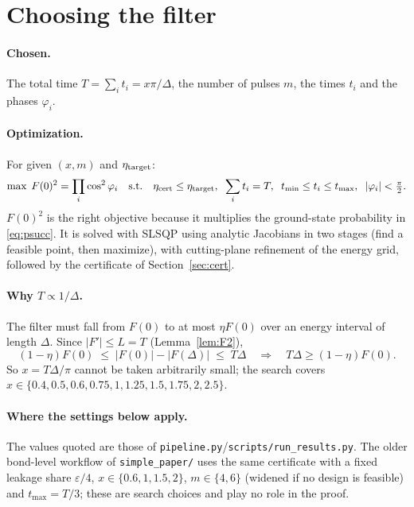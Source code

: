\documentclass[11pt]{article}
\theoremstyle{definition}
\newcommand{\abs}[1]{\left\lvert #1\right\rvert}
\newcommand{\eps}{\varepsilon}
\newcommand{\code}[1]{\texttt{#1}}
\begin{document}
\section{Choosing the filter}\label{sec:design}
\paragraph{Chosen.} The total time $T=\sum_it_i=x\pi/\Delta$, the number of pulses $m$, the times $t_i$ and the phases
$\varphi_i$.

\paragraph{Optimization.} For given $(x,m)$ and $\eta_{\rm target}$:
\begin{equation}
  \max\;F(0)^2=\prod_i\cos^2\varphi_i\quad\text{s.t.}\quad\eta_{\rm cert}\le\eta_{\rm target},\;\;\sum_it_i=T,\;\;t_{\min}\le t_i\le t_{\max},\;\;\abs{\varphi_i}<\tfrac\pi2 .
\end{equation}
$F(0)^2$ is the right objective because it multiplies the ground-state probability in \eqref{eq:psucc}. It is solved with
SLSQP using analytic Jacobians in two stages (find a feasible point, then maximize), with cutting-plane refinement of the
energy grid, followed by the certificate of Section~\ref{sec:cert}.

\paragraph{Why $T\propto1/\Delta$.} The filter must fall from $F(0)$ to at most $\eta F(0)$ over an energy interval of
length $\Delta$. Since $\abs{F'}\le L=T$ (Lemma~\ref{lem:F2}),
\begin{equation}\label{eq:Tlb}
  (1-\eta)F(0)\;\le\;\abs{F(0)}-\abs{F(\Delta)}\;\le\;T\Delta\quad\Longrightarrow\quad T\Delta\ge(1-\eta)F(0).
\end{equation}
So $x=T\Delta/\pi$ cannot be taken arbitrarily small; the search covers
$x\in\{0.4,0.5,0.6,0.75,1,1.25,1.5,1.75,2,2.5\}$.

\paragraph{Where the settings below apply.} The values quoted are those of \code{pipeline.py}/\code{scripts/run\_results.py}. The older bond-level workflow of \code{simple\_paper/} uses the same
certificate with a fixed leakage share $\eps/4$, $x\in\{0.6,1,1.5,2\}$, $m\in\{4,6\}$ (widened if no design is feasible) and $t_{\max}=T/3$; these are search choices and play no role in the proof.
\end{document}
